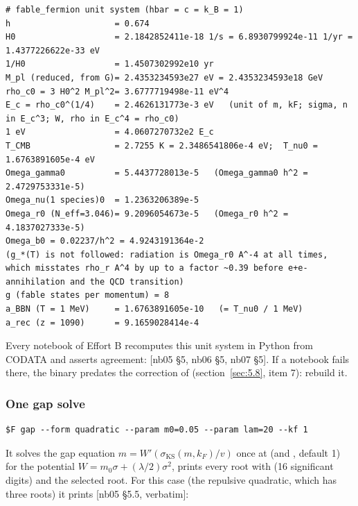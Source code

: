 \begin{Verbatim}
# fable_fermion unit system (hbar = c = k_B = 1)
h                     = 0.674
H0                    = 2.1842852411e-18 1/s = 6.8930799924e-11 1/yr = 1.4377226622e-33 eV
1/H0                  = 1.4507302992e10 yr
M_pl (reduced, from G)= 2.4353234593e27 eV = 2.4353234593e18 GeV
rho_c0 = 3 H0^2 M_pl^2= 3.6777719498e-11 eV^4
E_c = rho_c0^(1/4)    = 2.4626131773e-3 eV   (unit of m, kF; sigma, n in E_c^3; W, rho in E_c^4 = rho_c0)
1 eV                  = 4.0607270732e2 E_c
T_CMB                 = 2.7255 K = 2.3486541806e-4 eV;  T_nu0 = 1.6763891605e-4 eV
Omega_gamma0          = 5.4437728013e-5   (Omega_gamma0 h^2 = 2.4729753331e-5)
Omega_nu(1 species)0  = 1.2363206389e-5
Omega_r0 (N_eff=3.046)= 9.2096054673e-5   (Omega_r0 h^2 = 4.1837027333e-5)
Omega_b0 = 0.02237/h^2 = 4.9243191364e-2
(g_*(T) is not followed: radiation is Omega_r0 A^-4 at all times, which misstates rho_r A^4 by up to a factor ~0.39 before e+e- annihilation and the QCD transition)
g (fable states per momentum) = 8
a_BBN (T = 1 MeV)     = 1.6763891605e-10   (= T_nu0 / 1 MeV)
a_rec (z = 1090)      = 9.1659028414e-4
\end{Verbatim}

Every notebook of Effort B recomputes this unit system in Python from CODATA and asserts agreement:  [nb05 \S{}5, nb06 \S{}5, nb07 \S{}5]. If a notebook fails there, the binary predates the  correction of  (section~\ref{sec:5.8}, item 7): rebuild it.

\subsubsection{One gap solve}
\label{sec:6.4.4}

\begin{Verbatim}
$F gap --form quadratic --param m0=0.05 --param lam=20 --kf 1
\end{Verbatim}

It solves the gap equation $m = W'(\sigma_{\mathrm{KS}}(m, k_F)/v)$ once at  (and , default 1) for the potential $W = m_0 \sigma + (\lambda/2) \sigma^{2}$, prints every root with  (16 significant digits) and the selected root. For this case (the repulsive quadratic, which has three roots) it prints [nb05 \S{}5.5, verbatim]:

